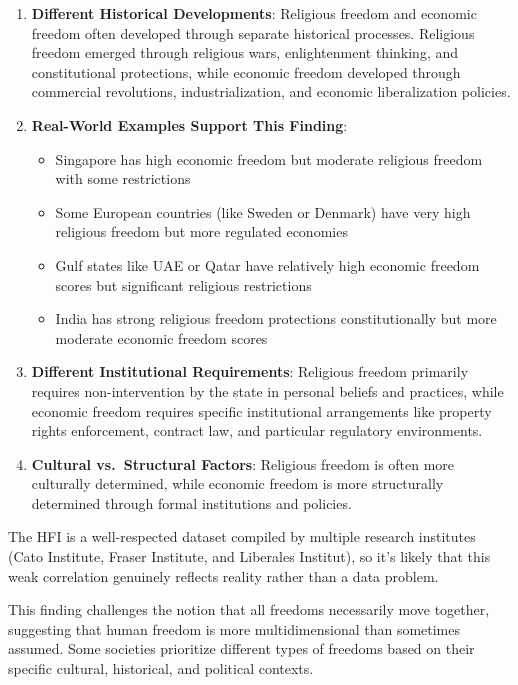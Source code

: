 \documentclass[
]{article}
\providecommand{\tightlist}{%
  \setlength{\itemsep}{0pt}\setlength{\parskip}{0pt}}
\begin{document}
\begin{enumerate}
\def\labelenumi{\arabic{enumi}.}
\item
  \textbf{Different Historical Developments}: Religious freedom and
  economic freedom often developed through separate historical
  processes. Religious freedom emerged through religious wars,
  enlightenment thinking, and constitutional protections, while economic
  freedom developed through commercial revolutions, industrialization,
  and economic liberalization policies.
\item
  \textbf{Real-World Examples Support This Finding}:

  \begin{itemize}
  \tightlist
  \item
    Singapore has high economic freedom but moderate religious freedom
    with some restrictions
  \item
    Some European countries (like Sweden or Denmark) have very high
    religious freedom but more regulated economies
  \item
    Gulf states like UAE or Qatar have relatively high economic freedom
    scores but significant religious restrictions
  \item
    India has strong religious freedom protections constitutionally but
    more moderate economic freedom scores
  \end{itemize}
\item
  \textbf{Different Institutional Requirements}: Religious freedom
  primarily requires non-intervention by the state in personal beliefs
  and practices, while economic freedom requires specific institutional
  arrangements like property rights enforcement, contract law, and
  particular regulatory environments.
\item
  \textbf{Cultural vs.~Structural Factors}: Religious freedom is often
  more culturally determined, while economic freedom is more
  structurally determined through formal institutions and policies.
\end{enumerate}

The HFI is a well-respected dataset compiled by multiple research
institutes (Cato Institute, Fraser Institute, and Liberales Institut),
so it's likely that this weak correlation genuinely reflects reality
rather than a data problem.

This finding challenges the notion that all freedoms necessarily move
together, suggesting that human freedom is more multidimensional than
sometimes assumed. Some societies prioritize different types of freedoms
based on their specific cultural, historical, and political contexts.
\end{document}
